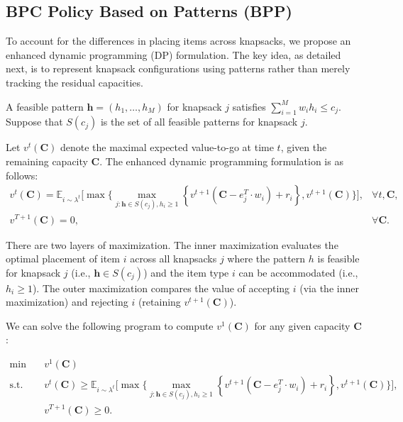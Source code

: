 \subsection{BPC Policy Based on Patterns (BPP)}
To account for the differences in placing items across knapsacks, we propose an enhanced dynamic programming (DP) formulation. The key idea, as detailed next, is to represent knapsack configurations using patterns rather than merely tracking the residual capacities.

A feasible pattern $\bm{h} = (h_{1}, \ldots, h_{M})$ for knapsack $j$ satisfies $\sum_{i=1}^{M} w_{i} h_{i} \leq c_{j}$. Suppose that $S(c_{j})$ is the set of all feasible patterns for knapsack $j$. 

Let $v^t(\bm{C})$ denote the maximal expected value-to-go at time $t$, given the remaining capacity $\bm{C}$. The enhanced dynamic programming formulation is as follows:
\begin{equation}
    \begin{array}{lr}
    v^t(\bm{C}) = \mathbb{E}_{i \sim \lambda^t}\Bigg[\max\Big\{\max_{j :\bm{h} \in S(c_{j}), 
    h_{i} \geqslant 1}\left\{v^{t+1}(\bm{C}- e_{j}^{T} \cdot w_{i})+ r_{i}\right\}, v^{t+1}(\bm{C})\Big\}\Bigg], & \forall t, \bm{C}, \\
    v^{T+1}(\bm{C})=0, & \forall \bm{C}.
    \end{array}
\end{equation}

There are two layers of maximization. The inner maximization evaluates the optimal placement of item 
$i$ across all knapsacks $j$ where the pattern $h$ is feasible for knapsack $j$ (i.e., $\bm{h} \in S(c_{j})$) and the item type $i$ can be accommodated (i.e., $h_{i} \geq 1$). The outer maximization compares the value of accepting $i$ (via the inner maximization) and rejecting $i$ (retaining $v^{t+1}(\bm{C})$).

We can solve the following program to compute $v^1(\bm{C})$ for any given capacity $\bm{C}$:

\begin{equation}\label{dp_bid}
    \begin{aligned}
    \min \quad & v^{1}(\bm{C}) \\
    \mathrm{s.t.} \quad & v^{t}(\bm{C}) \geq \mathbb{E}_{i \sim \lambda^t}\Bigg[\max\Big\{\max_{j :\bm{h} \in S(c_{j}), 
    h_{i} \geqslant 1}\left\{v^{t+1}(\bm{C}- e_{j}^{T} \cdot w_{i})+ r_i\right\}, v^{t+1}(\bm{C})\Big\}\Bigg], \\
    & v^{T+1}(\bm{C}) \geq 0.
    \end{aligned}
\end{equation}

